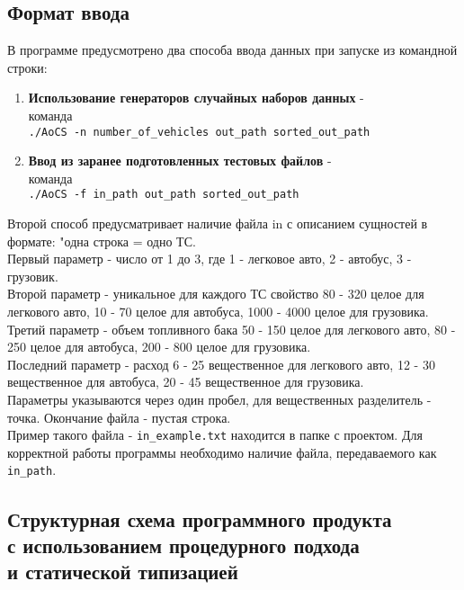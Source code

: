 \documentclass[a4paper]{article}
\begin{document}
\subsection*{Формат ввода}
В программе предусмотрено два способа ввода данных при запуске из командной строки:
\begin{enumerate} 
    \item \textbf{Использование генераторов случайных наборов данных} - \\команда \\\verb|./AoCS -n number_of_vehicles out_path sorted_out_path|
    
    \item \textbf{Ввод из заранее подготовленных тестовых
    файлов} - \\команда \\\verb|./AoCS -f in_path out_path sorted_out_path|
\end{enumerate}

Второй способ предусматривает наличие файла in с описанием сущностей в формате:
"одна строка = одно ТС.\\
Первый параметр - число от 1 до 3, где 1 - легковое авто, 2 - автобус, 3 - грузовик.\\
Второй параметр - уникальное для каждого ТС свойство
80 - 320 целое для легкового авто, 10 - 70 целое для автобуса, 1000 - 4000 целое для грузовика.\\
Третий параметр - объем топливного бака
50 - 150 целое для легкового авто, 80 - 250 целое для автобуса, 200 - 800 целое для грузовика.\\
Последний параметр - расход
6 - 25 вещественное для легкового авто, 12 - 30 вещественное для автобуса, 20 - 45 вещественное для грузовика.\\
Параметры указываются через один пробел, для вещественных разделитель - точка. Окончание файла - пустая строка.\\
Пример такого файла - \verb|in_example.txt| находится в папке с проектом. Для корректной работы программы необходимо наличие файла, передаваемого как \verb|in_path|.
\newpage
\begin{center}

\section*{Структурная схема программного продукта\\с использованием процедурного подхода\\ и статической типизацией}
\end{center}
\end{document}
